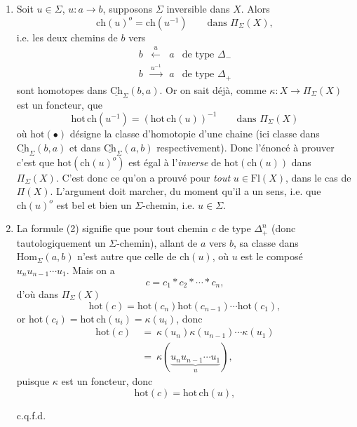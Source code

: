 \documentclass[11pt]{article}
\newcommand{\printedpage}[1]{\marginpar{\footnotesize p.~#1}}
\newcommand{\msp}[1]{\marginpar{\footnotesize [#1]}}
\newcommand{\Ch}{\underline{\mathrm{Ch}}}
\newcommand{\Fl}{\mathrm{Fl}}
\newcommand{\Hom}{\mathrm{Hom}}
\newcommand{\ch}{\mathrm{ch}}
\newcommand{\hot}{\mathrm{hot}}
\begin{document}
\begin{enumerate}[label={}]
\item[$1^o$)] Soit $u \in \Sigma$, $u : a \longrightarrow b$, supposons $\Sigma$ inversible dans $X$. Alors
\[
\ch(u)^o = \ch(u^{-1}) \qquad \text{dans } \Pi_\Sigma(X),
\]
i.e. les deux chemins de $b$ vers
\[
\begin{array}{cccl}
b & \xleftarrow{\ u\ } & a & \text{de type } \Delta_- \\
b & \xrightarrow{u^{-1}} & a & \text{de type } \Delta_+
\end{array}
\]
\printedpage{47}
sont homotopes dans $\Ch_\Sigma(b,a)$. Or on sait déjà, comme $\kappa : X \longrightarrow \Pi_\Sigma(X)$ est un foncteur, que
\[
\hot\,\ch(u^{-1}) = (\hot\,\ch(u))^{-1} \qquad \text{dans } \Pi_\Sigma(X)
\]
où $\hot(\bullet)$ désigne la classe d'homotopie d'une chaine (ici classe dans $\Ch_\Sigma(b,a)$ et dans $\Ch_\Sigma(a,b)$ respectivement). Donc l'énoncé à prouver c'est que $\hot(\ch(u)^o)$ est égal à l'\textit{inverse} de $\hot(\ch(u))$ dans $\Pi_\Sigma(X)$. C'est donc ce qu'on a prouvé pour \textit{tout} $u \in \Fl(X)$, dans le cas de $\Pi(X)$. L'argument doit marcher, du moment qu'il a un sens, i.e. que $\ch(u)^o$ est bel et bien un $\Sigma$-chemin, i.e. $u \in \Sigma$.

\item[$2^o$)] La formule (2) signifie que pour tout chemin $c$ de type $\Delta_+^n$ (donc tautologiquement un \msp{page 71} $\Sigma$-chemin), allant de $a$ vers $b$, sa classe dans $\Hom_\Sigma(a,b)$ n'est autre que celle de $\ch(u)$, où $u$ est le composé $u_nu_{n-1}\cdots u_1$. Mais on a
\[
c = c_1 * c_2 * \cdots * c_n,
\]
d'où dans $\Pi_\Sigma(X)$
\[
\hot(c) = \hot(c_n)\hot(c_{n-1})\cdots\hot(c_1),
\]
or $\hot(c_i) = \hot\,\ch(u_i) = \kappa(u_i)$, donc
\[
\begin{aligned}
\hot(c) \ &= \ \kappa(u_n)\kappa(u_{n-1})\cdots\kappa(u_1) \\
&= \ \kappa(\underbrace{u_nu_{n-1}\cdots u_1}_{u}),
\end{aligned}
\]
puisque $\kappa$ est un foncteur, donc
\[
\hot(c) = \hot\,\ch(u),
\]

\hfill c.q.f.d.
\end{enumerate}
\end{document}
